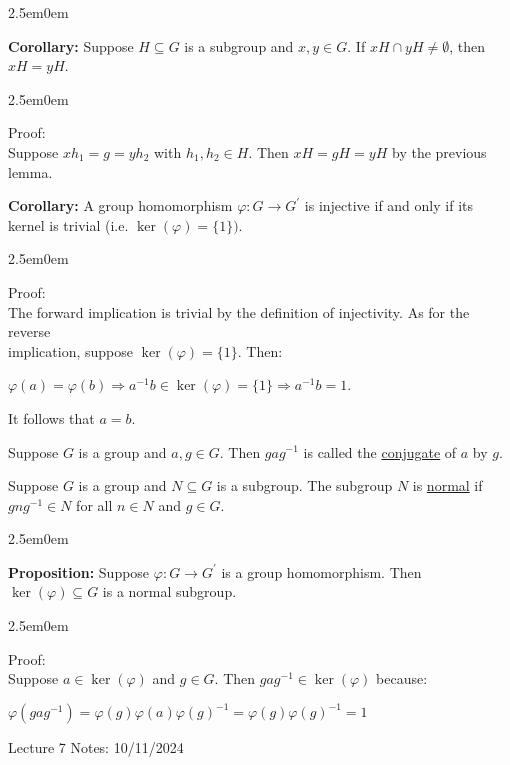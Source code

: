 \documentclass{book}
\newcommand{\hTwo}{%
\color{MidnightBlue}%
   \fontsize{13}{15}\selectfont%
}
\newcommand{\hThree}{%
   \color{PineGreen!85!Orange}
   \fontsize{12}{14}\selectfont%
}
\newenvironment{myIndent}{%
   \begin{adjustwidth}{2.5em}{0em}%
}{%
   \end{adjustwidth}%
}
\newcommand{\udefine}[1]{{%
   \setulcolor{Red}%
   \setul{0.14em}{0.07em}%
   \ul{#1}%
}}
\newcommand{\blab}[1]{\textbf{#1}}
\newcommand{\retTwo}{\hfill\bigbreak}
\newcommand{\mHeader}[1]{{
   \color{Black}%
   \fontsize{20}{18}\selectfont%
   #1\retTwo
}}
\begin{document}
\begin{myIndent}
	\blab{Corollary:} Suppose $H \subseteq G$ is a subgroup and $x, y \in G$. If $xH \cap yH \neq \emptyset$, then $xH = yH$.

	\begin{myIndent}\hThree
		Proof:\\
		Suppose $xh_1 = g = yh_2$ with $h_1, h_2 \in H$. Then $xH = gH = yH$ by the previous lemma.\retTwo
	\end{myIndent}

	\blab{Corollary:} A group homomorphism $\varphi: G \longrightarrow G^\prime$ is injective if and only if its kernel is trivial (i.e. $\ker(\varphi) = \{1\})$.

	\begin{myIndent}\hThree
		Proof:\\
		The forward implication is trivial by the definition of injectivity. As for the reverse\\ implication, suppose $\ker(\varphi) = \{1\}$. Then:
		
		{\centering $\varphi(a) = \varphi(b) \Longrightarrow a^{-1}b \in \ker(\varphi) = \{1\} \Longrightarrow a^{-1}b = 1$.\retTwo\par} It follows that $a = b$.\newpage
	\end{myIndent}
\end{myIndent}

Suppose $G$ is a group and $a, g \in G$. Then $gag^{-1}$ is called the \udefine{conjugate} of $a$ by $g$.\retTwo

Suppose $G$ is a group and $N \subseteq G$ is a subgroup. The subgroup $N$ is \udefine{normal} if $gng^{-1} \in N$ for all $n \in N$ and $g \in G$.

\begin{myIndent}\hTwo
	\blab{Proposition:} Suppose $\varphi: G \longrightarrow G^\prime$ is a group homomorphism. Then $\ker(\varphi) \subseteq G$ is a normal subgroup.
	
	\begin{myIndent}\hThree
		Proof:\\
		Suppose $a \in \ker(\varphi)$ and $g \in G$. Then $gag^{-1} \in \ker(\varphi)$ because:

		{\center $\varphi(gag^{-1}) = \varphi(g)\varphi(a)\varphi(g)^{-1} = \varphi(g)\varphi(g)^{-1} = 1$ \retTwo\par}
	\end{myIndent}
\end{myIndent}

\mHeader{Lecture 7 Notes: 10/11/2024}
\end{document}
